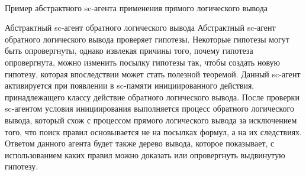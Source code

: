\begin{frame}{\\Пример абстрактного sc-агента применения прямого логического вывода}
\end{frame}

\begin{frame}{\Large Абстрактный sc-агент обратного логического вывода}
\vspace{8mm}
  Абстрактный sc-агент обратного логического вывода проверяет гипотезы. Некоторые гипотезы могут быть опровергнуты, однако извлекая причины того, почему гипотеза опровергнута, можно изменить посылку гипотезы так, чтобы создать новую гипотезу, которая впоследствии может стать полезной теоремой. Данный sc-агент активируется при появлении в sc-памяти инициированного действия, принадлежащего классу действие обратного логического вывода. После проверки sc-агентом условия инициирования выполняется процесс обратного логического вывода, который схож с процессом прямого логического вывода за исключением того, что поиск правил основывается не на посылках формул, а на их следствиях. Ответом данного агента будет также дерево вывода, которое показывает, с использованием каких правил можно доказать или опровергнуть выдвинутую гипотезу. 
\end{frame}


